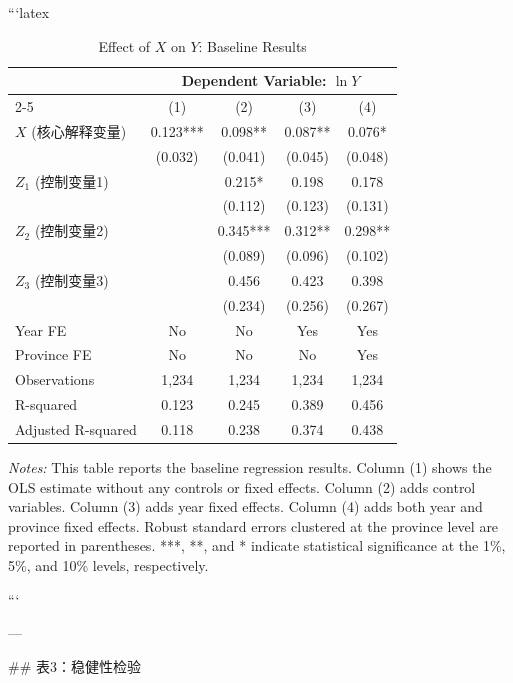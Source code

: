 ```latex
\begin{table}[htbp]
\centering
\caption{Effect of $X$ on $Y$: Baseline Results}
\label{tab:baseline}
\scriptsize
\begin{tabular}{lcccc}
\toprule
 & \multicolumn{4}{c}{Dependent Variable: $\ln Y$} \\
\cmidrule(lr){2-5}
 & (1) & (2) & (3) & (4) \\
\midrule
$X$ (核心解释变量) & 0.123*** & 0.098** & 0.087** & 0.076* \\
 & (0.032) & (0.041) & (0.045) & (0.048) \\
$Z_1$ (控制变量1) & & 0.215* & 0.198 & 0.178 \\
 & & (0.112) & (0.123) & (0.131) \\
$Z_2$ (控制变量2) & & 0.345*** & 0.312** & 0.298** \\
 & & (0.089) & (0.096) & (0.102) \\
$Z_3$ (控制变量3) & & 0.456 & 0.423 & 0.398 \\
 & & (0.234) & (0.256) & (0.267) \\
\midrule
Year FE & No & No & Yes & Yes \\
Province FE & No & No & No & Yes \\
\midrule
Observations & 1,234 & 1,234 & 1,234 & 1,234 \\
R-squared & 0.123 & 0.245 & 0.389 & 0.456 \\
Adjusted R-squared & 0.118 & 0.238 & 0.374 & 0.438 \\
\bottomrule
\end{tabular}
\begin{minipage}{\linewidth}
\smallskip
\textit{Notes:} This table reports the baseline regression results. Column (1) shows the OLS estimate without any controls or fixed effects. Column (2) adds control variables. Column (3) adds year fixed effects. Column (4) adds both year and province fixed effects. Robust standard errors clustered at the province level are reported in parentheses. ***, **, and * indicate statistical significance at the 1\%, 5\%, and 10\% levels, respectively.
\end{minipage}
\end{table}
```

---

## 表3：稳健性检验

